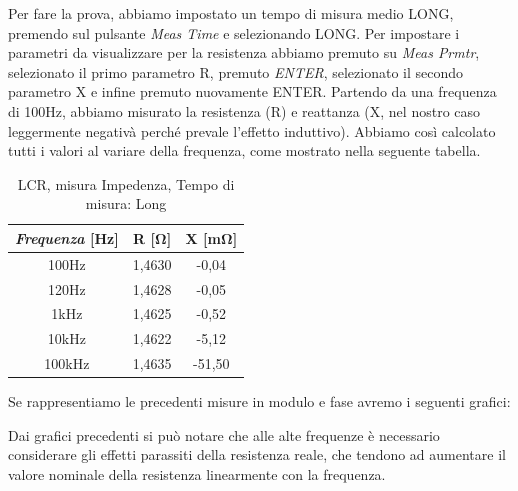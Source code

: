 Per fare la prova, abbiamo impostato un tempo di misura medio LONG, premendo sul pulsante \emph{Meas Time} e selezionando LONG.
Per impostare i parametri da visualizzare per la resistenza abbiamo premuto su \emph{Meas Prmtr}, selezionato il primo parametro R, premuto \emph{ENTER}, selezionato il secondo parametro X e infine premuto nuovamente ENTER.
Partendo da una frequenza di 100Hz, abbiamo misurato la resistenza (R) e reattanza (X, nel nostro caso leggermente negativà perché prevale l'effetto induttivo). Abbiamo così calcolato tutti i valori al variare della frequenza, come mostrato nella seguente tabella.  


\begin{table}[!ht]
\centering
\begin{tabular}{|c|c|c|}
\hline
\textit{\textbf{Frequenza}} \textbf{[Hz]} & \textbf{R [$\bm{\Omega}$]}  & \textbf{X [m$\bm{\Omega}$]}  \\ \hline
100Hz                       & 1,4630    & -0,04      \\ \hline
120Hz                       & 1,4628    & -0,05      \\ \hline
1kHz                        & 1,4625    & -0,52      \\ \hline
10kHz                       & 1,4622    & -5,12      \\ \hline
100kHz                      & 1,4635    & -51,50     \\ \hline
\end{tabular}
\caption{LCR, misura Impedenza, Tempo di misura: Long}
\label{tab:lcr_z}
\end{table}
\FloatBarrier


Se rappresentiamo le precedenti misure in modulo e fase avremo i seguenti grafici:
%

Dai grafici precedenti si può notare che alle alte frequenze è necessario considerare gli effetti parassiti della resistenza reale, che tendono ad aumentare il valore nominale della resistenza linearmente con la frequenza.

